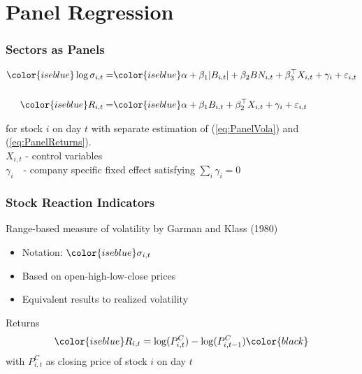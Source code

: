 \section{Panel Regression}

\begin{frame}
    \frametitle{Sectors as Panels}
    \label{panel}
    \small
    \begin{eqnarray}\label{eq:PanelVola}
    \color{iseblue}
    \log \sigma_{i, t} =& \color{iseblue}
    \alpha +   \beta_{1}|B_{i, t}| + 
    \beta_{2}BN_{i, t} + 
    \beta_{3}^\top X_{i,t} +
    \gamma_{i}+\varepsilon_{i,t}\\[\baselineskip]
    \color{iseblue}R_{i, t} =& \color{iseblue}    \alpha  + 
    \beta_{1}B_{i, t} + 
    \beta_{2}^\top X_{i,t} +
    \gamma_{i}+\varepsilon_{i,t}\label{eq:PanelReturns}\vspace{10pt}
    \end{eqnarray}
    
    for stock $i$ on day $t$ with separate estimation of (\ref{eq:PanelVola}) and (\ref{eq:PanelReturns}). \\[\baselineskip]
     $X_{i,t}$ - control variables \hyperlink{control}{}\\
     $\gamma_{i} \: \: \:$ - company specific fixed effect satisfying $\sum_{i}\gamma_i=0$
\end{frame}


\begin{frame}
    \frametitle{Stock Reaction Indicators}
    \label{GK2}
    \textcolor{isered}{Range-based measure of volatility} by {\color{iseblue}Garman and Klass (1980)} \\
    \vspace{3pt}
    \begin{itemize}
        \item Notation: $\color{iseblue}\sigma_{i,t} \quad $ \hyperlink{GK}{}
        \item Based on open-high-low-close prices
        \item Equivalent results to realized volatility 
    \end{itemize}
    \vspace{10pt} \textcolor{isered}{Returns}
    \begin{equation}
    \label{eq:ret}
    \color{iseblue} R_{i,t} = \log(P_{i,t}^C) - \log(P_{i,t-1}^C) \color{black}
    \end{equation}
    with $P_{i,t}^C$ as closing price of stock $i$ on day $t$
\end{frame}


